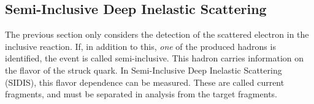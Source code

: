 \subsection{Semi-Inclusive Deep Inelastic Scattering}
\label{ssec::sidis}
    The previous section only considers the detection of the scattered electron in the inclusive reaction.
    If, in addition to this, \textit{one} of the produced hadrons is identified, the event is called semi-inclusive.
    This hadron carries information on the flavor of the struck quark.
    In Semi-Inclusive Deep Inelastic Scattering (SIDIS), this flavor dependence can be measured.
    These are called current fragments, and must be separated in analysis from the target fragments.

    
